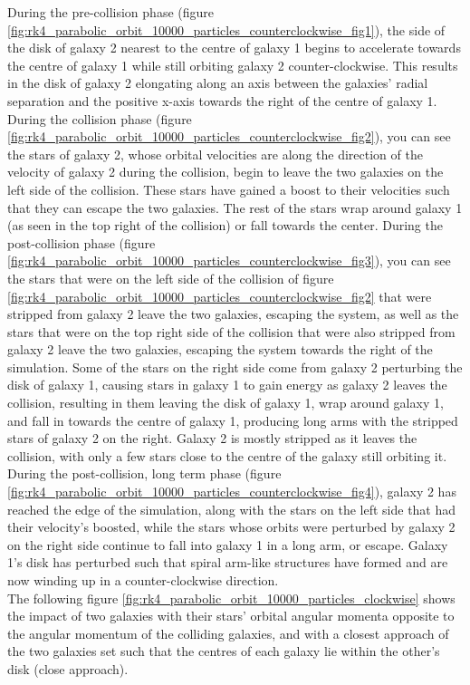 \documentclass[10pt,letterpaper]{article}
\begin{document}
During the pre-collision phase (figure \ref{fig:rk4_parabolic_orbit_10000_particles_counterclockwise_fig1}), the side of the disk of galaxy 2 nearest to the centre of galaxy 1 begins to accelerate towards the centre of galaxy 1 while still orbiting galaxy 2 counter-clockwise. This results in the disk of galaxy 2 elongating along an axis between the galaxies' radial separation and the positive x-axis towards the right of the centre of galaxy 1. During the collision phase (figure \ref{fig:rk4_parabolic_orbit_10000_particles_counterclockwise_fig2}), you can see the stars of galaxy 2, whose orbital velocities are along the direction of the velocity of galaxy 2 during the collision, begin to leave the two galaxies on the left side of the collision. These stars have gained a boost to their velocities such that they can escape the two galaxies. The rest of the stars wrap around galaxy 1 (as seen in the top right of the collision) or fall towards the center. During the post-collision phase (figure \ref{fig:rk4_parabolic_orbit_10000_particles_counterclockwise_fig3}), you can see the stars that were on the left side of the collision of figure \ref{fig:rk4_parabolic_orbit_10000_particles_counterclockwise_fig2} that were stripped from galaxy 2 leave the two galaxies, escaping the system, as well as the stars that were on the top right side of the collision that were also stripped from galaxy 2 leave the two galaxies, escaping the system towards the right of the simulation. Some of the stars on the right side come from galaxy 2 perturbing the disk of galaxy 1, causing stars in galaxy 1 to gain energy as galaxy 2 leaves the collision, resulting in them leaving the disk of galaxy 1, wrap around galaxy 1, and fall in towards the centre of galaxy 1, producing long arms with the stripped stars of galaxy 2 on the right. Galaxy 2 is mostly stripped as it leaves the collision, with only a few stars close to the centre of the galaxy still orbiting it. During the post-collision, long term phase (figure \ref{fig:rk4_parabolic_orbit_10000_particles_counterclockwise_fig4}), galaxy 2 has reached the edge of the simulation, along with the stars on the left side that had their velocity's boosted, while the stars whose orbits were perturbed by galaxy 2 on the right side continue to fall into galaxy 1 in a long arm, or escape. Galaxy 1's disk has perturbed such that spiral arm-like structures have formed and are now winding up in a counter-clockwise direction.\\

The following figure \ref{fig:rk4_parabolic_orbit_10000_particles_clockwise} shows the impact of two galaxies with their stars' orbital angular momenta opposite to the angular momentum of the colliding galaxies, and with a closest approach of the two galaxies set such that the centres of each galaxy lie within the other's disk (close approach).\\
\end{document}
